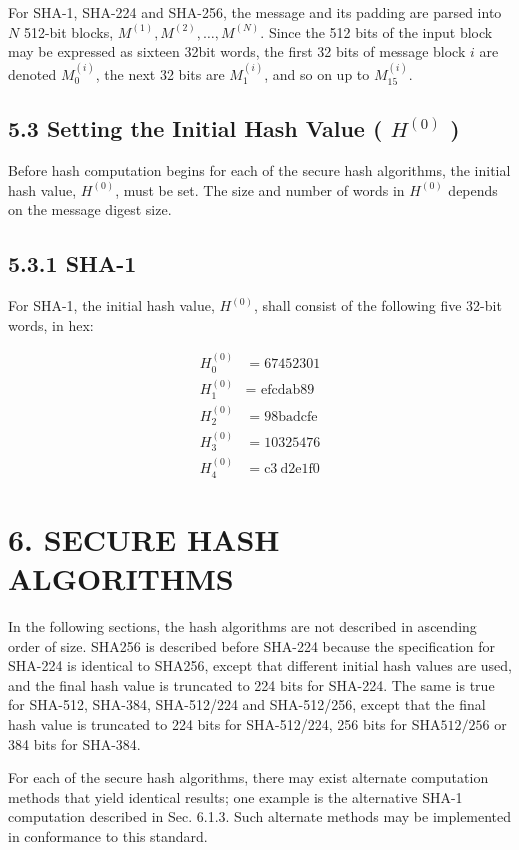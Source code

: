 For SHA-1, SHA-224 and SHA-256, the message and its padding are parsed into \(N\) 512-bit blocks, \(M^{(1)}, M^{(2)}, \ldots, M^{(N)}\). Since the 512 bits of the input block may be expressed as sixteen 32bit words, the first 32 bits of message block \(i\) are denoted \(M_{0}^{(i)}\), the next 32 bits are \(M_{1}^{(i)}\), and so on up to \(M_{15}^{(i)}\).

\subsection*{5.3 Setting the Initial Hash Value ( \(H^{(0)}\) )}

Before hash computation begins for each of the secure hash algorithms, the initial hash value, \(H^{(0)}\), must be set. The size and number of words in \(H^{(0)}\) depends on the message digest size.

\subsection*{5.3.1 SHA-1}

For SHA-1, the initial hash value, \(H^{(0)}\), shall consist of the following five 32-bit words, in hex:

\[
\begin{aligned}
H_{0}^{(0)} & =67452301 \\
H_{1}^{(0)} & =\text { efcdab89 } \\
H_{2}^{(0)} & =98 \mathrm{badcfe} \\
H_{3}^{(0)} & =10325476 \\
H_{4}^{(0)} & =\mathrm{c} 3 \mathrm{~d} 2 \mathrm{e} 1 \mathrm{f0}
\end{aligned}
\]

\section*{6. SECURE HASH ALGORITHMS}

In the following sections, the hash algorithms are not described in ascending order of size. SHA256 is described before SHA-224 because the specification for SHA-224 is identical to SHA256, except that different initial hash values are used, and the final hash value is truncated to 224 bits for SHA-224. The same is true for SHA-512, SHA-384, SHA-512/224 and SHA-512/256, except that the final hash value is truncated to 224 bits for SHA-512/224, 256 bits for SHA\(512 / 256\) or 384 bits for SHA-384.

For each of the secure hash algorithms, there may exist alternate computation methods that yield identical results; one example is the alternative SHA-1 computation described in Sec. 6.1.3. Such alternate methods may be implemented in conformance to this standard.

